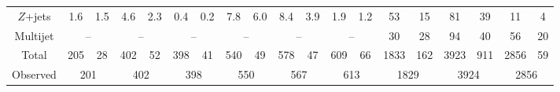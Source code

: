 \begin{table}[tbp]
\begin{center}
{\begin{tabular}{| c | c@{\ $\pm$\ }c c@{\ $\pm$\ }c c@{\ $\pm$\ }c | c@{\ $\pm$\ }c  c@{\ $\pm$\ }c c@{\ $\pm$\ }c | c@{\ $\pm$\ }c  c@{\ $\pm$\ }c c@{\ $\pm$\ }c |}
				$Z$+jets&                    1.6 &         1.5&                    4.6 &         2.3&                    0.4 &         0.2&                    7.8 &         6.0&                    8.4 &         3.9&                    1.9 &         1.2&                     53 &          15&                     81 &          39&                     11 &           4\\
				Multijet&\multicolumn{2}{c}{   --}             &\multicolumn{2}{c}{   --}             &\multicolumn{2}{c|}{   --}             &\multicolumn{2}{c}{   --}             &\multicolumn{2}{c}{   --}             &\multicolumn{2}{c|}{   --}             &                     30 &          28&                     94 &          40&                     56 &          20\\
				\hline
				Total&                    205 &          28&                    402 &          52&                    398 &          41&                    540 &          49&                    578 &          47&                    609 &          66&                   1833 &         162&                   3923 &         911&                   2856 &          59\\
				\hline
				Observed&\multicolumn{2}{c}{ 201}             &\multicolumn{2}{c}{ 402}             &\multicolumn{2}{c|}{ 398}             &\multicolumn{2}{c}{ 550}             &\multicolumn{2}{c}{ 567}             &\multicolumn{2}{c|}{ 613}             &\multicolumn{2}{c}{1829}             &\multicolumn{2}{c}{3924}             &\multicolumn{2}{c|}{2856}             \\
				\hline
				\hline
			\end{tabular}
		}
		\label{tab:yields_VBFWZ}
	\end{center}
\end{table}




